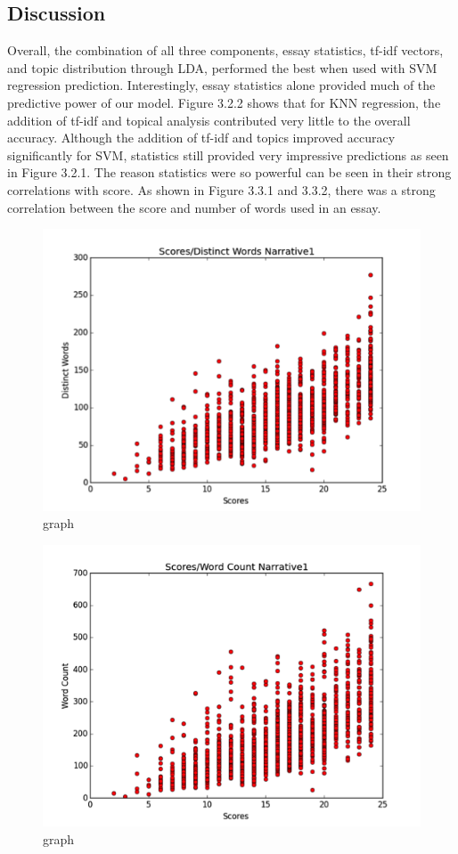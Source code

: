 \documentclass{article}
\begin{document}
\subsection{Discussion}
Overall, the combination of all three components, essay statistics, tf-idf vectors, and topic distribution through LDA, performed the best when used with SVM regression prediction. Interestingly, essay statistics alone provided much of the predictive power of our model. Figure 3.2.2 shows that for KNN regression, the addition of tf-idf and topical analysis contributed very little to the overall accuracy. Although the addition of tf-idf and topics improved accuracy significantly for SVM, statistics still provided very impressive predictions as seen in Figure 3.2.1. 
The reason statistics were so powerful can be seen in their strong correlations with score.  As shown in Figure 3.3.1 and 3.3.2, there was a strong correlation between the score and number of words used in an essay.
\begin{figure}[H]
\centering
\centerline{\includegraphics[width=\columnwidth]{"331"}}
\caption{graph}
\label{331}
\vskip -0.2in
\end{figure} 
\begin{figure}[H]
\centering
\centerline{\includegraphics[width=\columnwidth]{"332"}}
\caption{graph}
\label{332}
\vskip -0.2in
\end{figure} 
\end{document}
